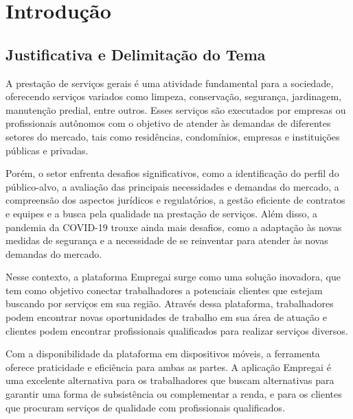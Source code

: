 \chapter{Introdução}


\section{Justificativa e Delimitação do Tema}

A prestação de serviços gerais é uma atividade fundamental para a sociedade, oferecendo serviços variados como limpeza, conservação, segurança, jardinagem, manutenção predial, entre outros. Esses serviços são executados por empresas ou profissionais autônomos com o objetivo de atender às demandas de diferentes setores do mercado, tais como residências, condomínios, empresas e instituições públicas e privadas.

Porém, o setor enfrenta desafios significativos, como a identificação do perfil do público-alvo, a avaliação das principais necessidades e demandas do mercado, a compreensão dos aspectos jurídicos e regulatórios, a gestão eficiente de contratos e equipes e a busca pela qualidade na prestação de serviços. Além disso, a pandemia da COVID-19 trouxe ainda mais desafios, como a adaptação às novas medidas de segurança e a necessidade de se reinventar para atender às novas demandas do mercado.

Nesse contexto, a plataforma Empregai surge como uma solução inovadora, que tem como objetivo conectar trabalhadores a potenciais clientes que estejam buscando por serviços em sua região. Através dessa plataforma, trabalhadores podem encontrar novas oportunidades de trabalho em sua área de atuação e clientes podem encontrar profissionais qualificados para realizar serviços diversos.

Com a disponibilidade da plataforma em dispositivos móveis, a ferramenta oferece praticidade e eficiência para ambas as partes. A aplicação Empregai é uma excelente alternativa para os trabalhadores que buscam alternativas para garantir uma forma de subsistência ou complementar a renda, e para os clientes que procuram serviços de qualidade com profissionais qualificados.


